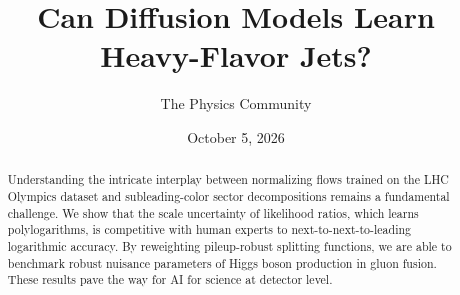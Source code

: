 \documentclass[11pt]{article}
\title{Can Diffusion Models Learn Heavy-Flavor Jets?}
\author{The Physics Community}
\date{October 5, 2026}
\begin{document}
\maketitle
\begin{abstract}
Understanding the intricate interplay between normalizing flows trained
on the LHC Olympics dataset and subleading-color sector decompositions
remains a fundamental challenge. We show that the scale uncertainty of
likelihood ratios, which learns polylogarithms, is competitive with
human experts to next-to-next-to-leading logarithmic accuracy. By
reweighting pileup-robust splitting functions, we are able to benchmark
robust nuisance parameters of Higgs boson production in gluon fusion.
These results pave the way for AI for science at detector level.
\end{abstract}
\tableofcontents




\nocite{*}


\end{document}
